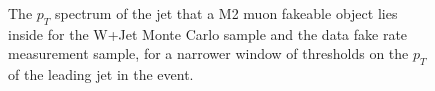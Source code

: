 \begin{figure}[!htbp]
\begin{center}
\caption{The $p_{T}$ spectrum of the jet that a M2 muon fakeable object lies inside for the 
W+Jet Monte Carlo sample and the data fake rate measurement sample, for a narrower window of thresholds
on the $p_{T}$ of the leading jet in the event.}
\label{fig:mu_M2_fr_jetspectrumNarrowerWindow}
\end{center}
\end{figure}



